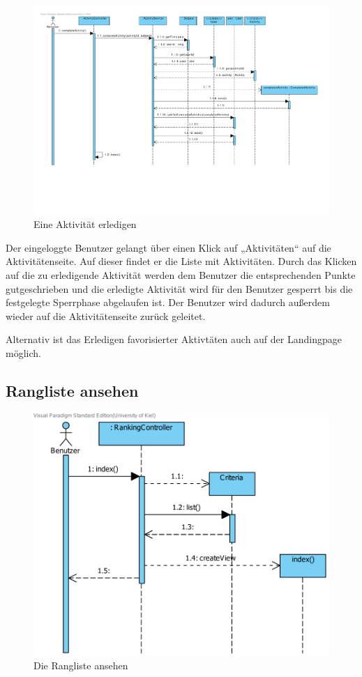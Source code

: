 \begin{figure}[H]
  \centering
  \includegraphics[width=\textwidth, clip]{gfx/aktivitaet_erledigen}
  \caption{Eine Aktivität erledigen}
\end{figure}

Der eingeloggte Benutzer gelangt über einen Klick auf „Aktivitäten“
auf die Aktivitätenseite. Auf dieser findet er die Liste mit
Aktivitäten. Durch das Klicken auf die zu erledigende Aktivität werden
dem Benutzer die entsprechenden Punkte gutgeschrieben und die
erledigte Aktivität wird für den Benutzer gesperrt bis die festgelegte
Sperrphase abgelaufen ist. Der Benutzer wird dadurch außerdem wieder auf die
Aktivitätenseite zurück geleitet.

Alternativ ist das Erledigen favorisierter Aktivtäten auch auf der
Landingpage möglich.

\subsection{Rangliste ansehen}

\begin{figure}[H]
  \centering
  \includegraphics[width=\textwidth, clip]{gfx/Ranking_Web}
  \caption{Die Rangliste ansehen}
\end{figure}

